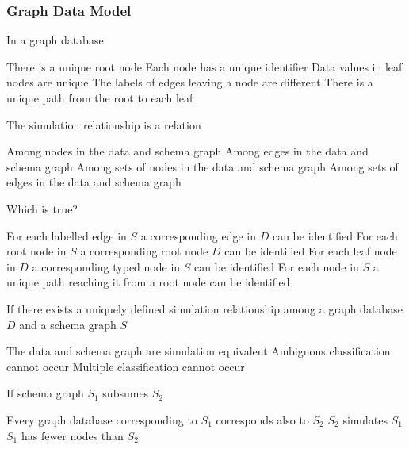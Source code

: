 \documentclass[12pt,a4paper]{exam} %
\begin{document}
\subsubsection{Graph Data Model}
\begin{questions}
\question In a graph database
\begin{checkboxes}
\choice There is a unique root node
\CorrectChoice Each node has a unique identifier
\choice Data values in leaf nodes are unique
\choice The labels of edges leaving a node are different
\choice There is a unique path from the root to each leaf
\end{checkboxes}

\question The simulation relationship is a relation
\begin{checkboxes}
\CorrectChoice Among nodes in the data and schema graph
\choice Among edges in the data and schema graph
\choice Among sets of nodes in the data and schema graph
\choice Among sets of edges in the data and schema graph
\end{checkboxes}

\question Which is true?
\begin{checkboxes}
\choice For each labelled edge in $S$ a corresponding edge in $D$ can be identified
\choice For each root node in $S$ a corresponding root node $D$ can be identified
\CorrectChoice For each leaf node in $D$ a corresponding typed node in $S$ can be identified
\choice For each node in $S$ a unique path reaching it from a root node can be identified
\end{checkboxes}

\question If there exists a uniquely defined simulation relationship among a graph database $D$ and a schema graph $S$
\begin{checkboxes}
\choice The data and schema graph are simulation equivalent
\CorrectChoice Ambiguous classification cannot occur
\choice Multiple classification cannot occur
\end{checkboxes}

\question If schema graph $S_1$ subsumes $S_2$
\begin{checkboxes}
\choice Every graph database corresponding to $S_1$ corresponds also to $S_2$
\CorrectChoice $S_2$ simulates $S_1$
\choice $S_1$ has fewer nodes than $S_2$
\end{checkboxes}
\end{questions}
\end{document}
